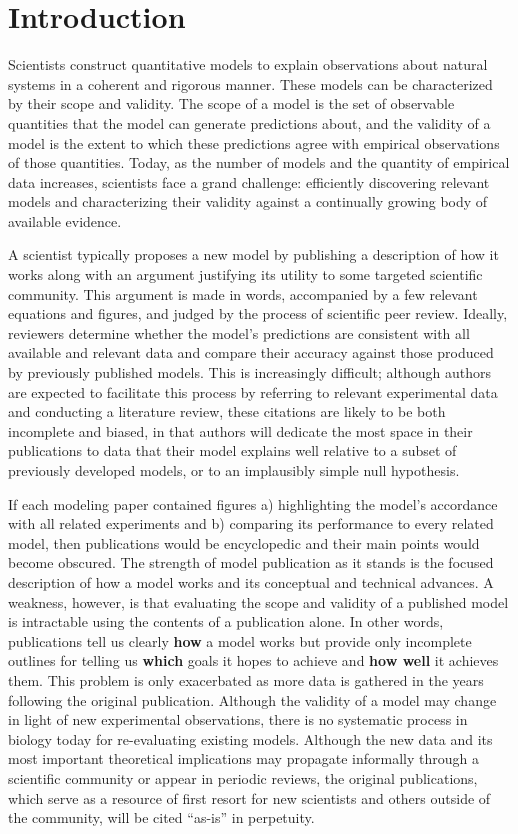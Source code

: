 \documentclass[11pt,letterpaper]{article}
\begin{document}
\section{Introduction}
Scientists construct quantitative models to explain observations about natural systems in a coherent and rigorous manner. These models can be characterized by their scope and validity. The scope of a model is the set of observable quantities that the model can generate predictions about, and the validity of a model is the extent to which these predictions agree with empirical observations of those quantities. Today, as the number of models and the quantity of empirical data increases, scientists face a grand challenge: efficiently discovering relevant models and characterizing their validity against a continually growing body of available evidence. 

A scientist typically proposes a new model by publishing a description of how it works along with an argument justifying its utility to some targeted scientific community. This argument is made in words, accompanied by a few relevant equations and figures, and judged by the process of scientific peer review. Ideally, reviewers determine whether the model's predictions are consistent with all available and relevant data and compare their accuracy against those produced by previously published models. This is increasingly difficult; although authors are expected to facilitate this process by referring to relevant experimental data and conducting a literature review, these citations are likely to be both incomplete and biased, in that authors will dedicate the most space in their publications to data that their model explains well relative to a subset of previously developed models, or to an implausibly simple null hypothesis.

If each modeling paper contained figures a) highlighting the model's accordance with all related experiments and b) comparing its performance to every related model, then publications would be encyclopedic and their main points would become obscured. The strength of model publication as it stands is the focused description of how a model works and its conceptual and technical advances. A weakness, however, is that evaluating the scope and validity of a published model is intractable using the contents of a publication alone. In other words, publications tell us clearly \textbf{how} a model works but provide only incomplete outlines for telling us \textbf{which} goals it hopes to achieve and \textbf{how well} it achieves them. This problem is only exacerbated as more data is gathered in the years following the original publication. Although the validity of a model may change in light of new experimental observations, there is no systematic process in biology today for re-evaluating existing models. Although the new data and its most important theoretical implications may propagate informally through a scientific community or appear in periodic reviews, the original publications, which serve as a resource of first resort for new scientists and others outside of the community, will be cited ``as-is'' in perpetuity. 	
\end{document}
